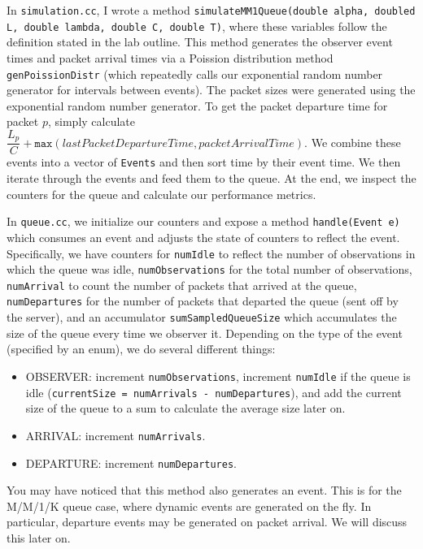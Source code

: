\documentclass{article}
\begin{document}
In \texttt{simulation.cc}, I wrote a method \texttt{simulateMM1Queue(double alpha, doubled L, double lambda, double C, double T)},
where these variables follow the definition stated in the lab outline. This method generates the observer event times and packet arrival
times via a Poission distribution method \texttt{genPoissionDistr} (which repeatedly calls our exponential random number generator for intervals
between events). The packet sizes were generated using the exponential random number generator. To get the packet departure time for packet $p$, simply calculate
$\dfrac{L_p}{C} + \texttt{max}(lastPacketDepartureTime, packetArrivalTime)$. We combine these events into a vector of \texttt{Events} and then sort
time by their event time. We then iterate through the events and feed them to the queue. At the end, we inspect the counters for the queue and calculate our
performance metrics. \newline

In \texttt{queue.cc}, we initialize our counters and expose a method \texttt{handle(Event e)} which consumes an event and adjusts the state of counters
to reflect the event. Specifically, we have counters for \texttt{numIdle} to reflect the number of observations in which the queue was idle,
\texttt{numObservations} for the total number of observations, \texttt{numArrival} to count the number of packets that arrived at the queue,
\texttt{numDepartures} for the number of packets that departed the queue (sent off by the server), and an accumulator \texttt{sumSampledQueueSize} which
accumulates the size of the queue every time we observer it. Depending on the type of the event (specified by an enum), we do several different things:

\begin{itemize}
    \item OBSERVER: increment \texttt{numObservations}, increment \texttt{numIdle} if the queue is idle (\texttt{currentSize = numArrivals - numDepartures}), and add
    the current size of the queue to a sum to calculate the average size later on.
    \item ARRIVAL: increment \texttt{numArrivals}.
    \item DEPARTURE: increment \texttt{numDepartures}.
\end{itemize}

You may have noticed that this method also generates an event. This is for the M/M/1/K queue case, where dynamic events are generated on the fly. In particular,
departure events may be generated on packet arrival. We will discuss this later on. \newline
\end{document}
